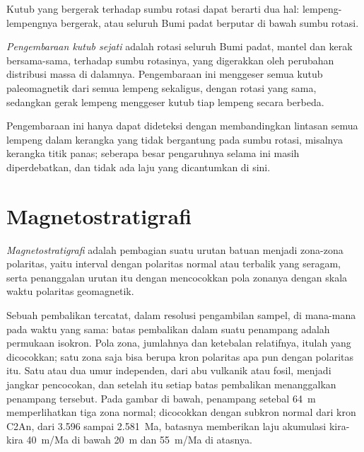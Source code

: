 Kutub yang bergerak terhadap sumbu rotasi dapat berarti dua hal: lempeng-lempengnya
bergerak, atau seluruh Bumi padat berputar di bawah sumbu rotasi.

\begin{definition}\label{def:b3:palaeomagnetism:tpw}
\emph{Pengembaraan kutub sejati} adalah rotasi seluruh
Bumi padat, mantel dan kerak bersama-sama, terhadap sumbu rotasinya, yang digerakkan
oleh perubahan distribusi massa di dalamnya. Pengembaraan ini menggeser
semua kutub paleomagnetik dari semua lempeng sekaligus, dengan rotasi yang sama, sedangkan
gerak lempeng menggeser kutub tiap lempeng secara berbeda.
\end{definition}

Pengembaraan ini hanya dapat dideteksi dengan membandingkan lintasan semua lempeng dalam
kerangka yang tidak bergantung pada sumbu rotasi, misalnya kerangka titik panas; seberapa besar
pengaruhnya selama ini masih diperdebatkan, dan tidak ada laju yang dicantumkan di sini.

\section{Magnetostratigrafi}

\begin{definition}[Magnetostratigrafi]\label{def:b3:palaeomagnetism:magnetostratigraphy}
\emph{Magnetostratigrafi} adalah pembagian suatu
urutan batuan menjadi zona-zona polaritas, yaitu interval dengan polaritas normal atau terbalik
yang seragam, serta penanggalan urutan itu dengan mencocokkan pola zonanya dengan
skala waktu polaritas geomagnetik.
\end{definition}

Sebuah pembalikan tercatat, dalam resolusi pengambilan sampel, di mana-mana pada
waktu yang sama: batas pembalikan dalam suatu penampang adalah permukaan isokron.
Pola zona, jumlahnya dan ketebalan relatifnya, itulah yang dicocokkan; satu zona saja
bisa berupa kron polaritas apa pun dengan polaritas itu. Satu atau dua
umur independen, dari abu vulkanik atau fosil, menjadi jangkar pencocokan, dan setelah itu
setiap batas pembalikan menanggalkan penampang tersebut. Pada gambar di bawah, penampang setebal
\qty{64}{m} memperlihatkan tiga zona normal; dicocokkan dengan subkron normal dari
kron C2An, dari 3.596 sampai \qty{2.581}{Ma}, batasnya memberikan laju akumulasi
kira-kira \qty{40}{m/Ma} di bawah \qty{20}{m} dan \qty{55}{m/Ma} di atasnya.

